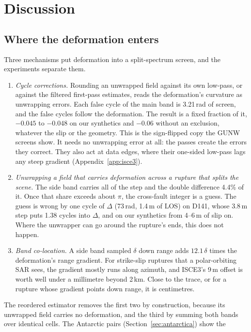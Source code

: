 \section{Discussion}
\label{sec:discussion}

\subsection{Where the deformation enters}
Three mechanisms put deformation into a split-spectrum screen, and the experiments separate them.
\begin{enumerate}
  \item \emph{Cycle corrections.} Rounding an unwrapped field against its own low-pass, or against the filtered
        first-pass estimates, reads the deformation's curvature as unwrapping errors. Each false cycle of the main
        band is 3.21\,rad of screen, and the false cycles follow the deformation. The result is a fixed fraction of
        it, $-0.045$ to $-0.048$ on our synthetics and $-0.06$ without an exclusion, whatever the slip or the
        geometry. This is the sign-flipped copy the GUNW screens show. It needs no unwrapping error at all: the passes
        create the errors they correct. They also act at data edges, where their one-sided low-pass lags any steep
        gradient (Appendix~\ref{app:isce3}).
  \item \emph{Unwrapping a field that carries deformation across a rupture that splits the scene.} The side band
        carries all of the step and the double difference 4.4\% of it. Once that share exceeds about $\pi$, the
        cross-fault integer is a guess. The guess is wrong by one cycle of $\Delta$ (73\,rad, 1.4\,m of LOS) on D141,
        whose 3.8\,m step puts 1.38 cycles into $\Delta$, and on our synthetics from 4--6\,m of slip on. Where the
        unwrapper can go around the rupture's ends, this does not happen.
  \item \emph{Band co-location.} A side band sampled $\delta$ down range adds $12.1\,\delta$ times the deformation's
        range gradient. For strike-slip ruptures that a polar-orbiting SAR sees, the gradient mostly runs along
        azimuth, and ISCE3's 9\,m offset is worth well under a millimetre beyond 2\,km. Close to the trace, or for a
        rupture whose gradient points down range, it is centimetres.
\end{enumerate}
The reordered estimator removes the first two by construction, because its unwrapped field carries no deformation,
and the third by summing both bands over identical cells. The Antarctic pairs (Section~\ref{sec:antarctica}) show the
